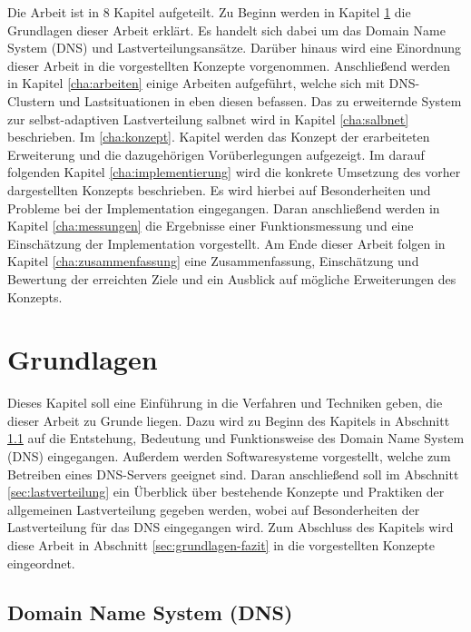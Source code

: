 \documentclass[a4paper, 12pt, BCOR10mm, DIV12, toc=bibliography, toc=listof, german]{scrbook}
\def \dns {Domain Name System (DNS)}
\begin{document}
		Die Arbeit ist in 8 Kapitel aufgeteilt. Zu Beginn werden in Kapitel \ref{cha:grundlagen} die
		Grundlagen dieser Arbeit erklärt. Es handelt sich dabei um das \dns{} und
		Lastverteilungsansätze.  Darüber hinaus wird eine Einordnung dieser Arbeit in die vorgestellten
		Konzepte vorgenommen.  Anschließend werden in Kapitel \ref{cha:arbeiten} einige Arbeiten
		aufgeführt, welche sich mit DNS-Clustern und Lastsituationen in eben diesen befassen. Das zu
		erweiternde System zur selbst-adaptiven Lastverteilung salbnet \cite{zinke2012,salbnet} wird in
		Kapitel \ref{cha:salbnet} beschrieben.  Im \ref{cha:konzept}. Kapitel werden das Konzept der
		erarbeiteten Erweiterung und die dazugehörigen Vorüberlegungen aufgezeigt.  Im darauf folgenden
		Kapitel \ref{cha:implementierung} wird die konkrete Umsetzung des vorher dargestellten Konzepts
		beschrieben.  Es wird hierbei auf Besonderheiten und Probleme bei der Implementation
		eingegangen.  Daran anschließend werden in Kapitel \ref{cha:messungen} die Ergebnisse einer
		Funktionsmessung und eine Einschätzung der Implementation vorgestellt. Am Ende dieser Arbeit
		folgen in Kapitel \ref{cha:zusammenfassung} eine Zusammenfassung, Einschätzung und Bewertung der
		erreichten Ziele und ein Ausblick auf mögliche Erweiterungen des Konzepts.


	\chapter{Grundlagen} %
	\label{cha:grundlagen}

		Dieses Kapitel soll eine Einführung in die Verfahren und Techniken geben, die dieser Arbeit
		zu Grunde liegen.  Dazu wird zu Beginn des Kapitels in Abschnitt \ref{sec:dns} auf die Entstehung,
		Bedeutung und Funktionsweise des \dns{} eingegangen. Außerdem werden Softwaresysteme
		vorgestellt, welche zum Betreiben eines DNS-Servers geeignet sind. Daran anschließend soll im
		Abschnitt \ref{sec:lastverteilung} ein Überblick über bestehende Konzepte und Praktiken der
		allgemeinen Lastverteilung gegeben werden, wobei auf Besonderheiten der Lastverteilung für das
		DNS eingegangen wird. Zum Abschluss des Kapitels wird diese Arbeit in Abschnitt
		\ref{sec:grundlagen-fazit} in die vorgestellten Konzepte eingeordnet.

		\section{\dns{}} %
		\label{sec:dns}
\end{document}
